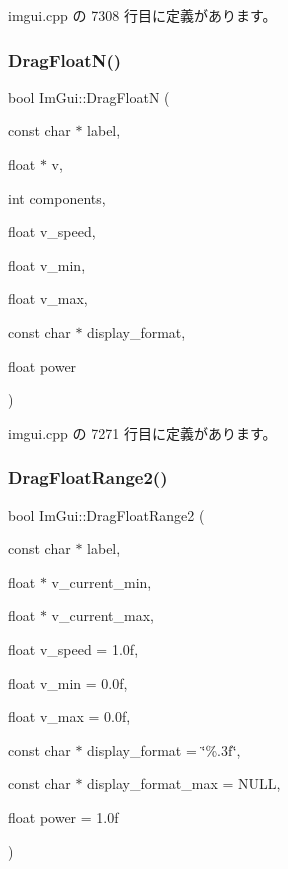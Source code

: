  imgui.\+cpp の 7308 行目に定義があります。

\mbox{\label{namespace_im_gui_a2a2764b6f0b3291ad0df4d99127dd751}} 
\subsubsection{\texorpdfstring{Drag\+Float\+N()}{DragFloatN()}}
{\footnotesize\ttfamily bool Im\+Gui\+::\+Drag\+FloatN (\begin{DoxyParamCaption}\item[{const char $\ast$}]{label,  }\item[{float $\ast$}]{v,  }\item[{int}]{components,  }\item[{float}]{v\+\_\+speed,  }\item[{float}]{v\+\_\+min,  }\item[{float}]{v\+\_\+max,  }\item[{const char $\ast$}]{display\+\_\+format,  }\item[{float}]{power }\end{DoxyParamCaption})}



 imgui.\+cpp の 7271 行目に定義があります。

\mbox{\label{namespace_im_gui_ad6e3b0e5a2171679c53d6b18e16a460b}} 
\subsubsection{\texorpdfstring{Drag\+Float\+Range2()}{DragFloatRange2()}}
{\footnotesize\ttfamily bool Im\+Gui\+::\+Drag\+Float\+Range2 (\begin{DoxyParamCaption}\item[{const char $\ast$}]{label,  }\item[{float $\ast$}]{v\+\_\+current\+\_\+min,  }\item[{float $\ast$}]{v\+\_\+current\+\_\+max,  }\item[{float}]{v\+\_\+speed = {\ttfamily 1.0f},  }\item[{float}]{v\+\_\+min = {\ttfamily 0.0f},  }\item[{float}]{v\+\_\+max = {\ttfamily 0.0f},  }\item[{const char $\ast$}]{display\+\_\+format = {\ttfamily \char`\"{}\%.3f\char`\"{}},  }\item[{const char $\ast$}]{display\+\_\+format\+\_\+max = {\ttfamily NULL},  }\item[{float}]{power = {\ttfamily 1.0f} }\end{DoxyParamCaption})}



